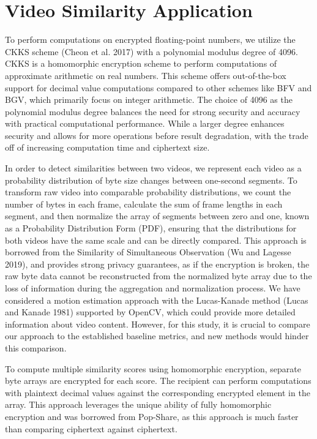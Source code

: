 \section{Video Similarity Application}
To perform computations on encrypted floating-point numbers, we utilize the CKKS scheme (Cheon et al. 2017) with a polynomial modulus degree of 4096. CKKS is a homomorphic encryption scheme to perform computations of approximate arithmetic on real numbers. This scheme offers out-of-the-box support for decimal value computations compared to other schemes like BFV and BGV, which primarily focus on integer arithmetic. The choice of 4096 as the polynomial modulus degree balances the need for strong security and accuracy with practical computational performance. While a larger degree enhances security and allows for more operations before result degradation, with the trade off of increasing computation time and ciphertext size.

In order to detect similarities between two videos, we represent each video as a probability distribution of byte size changes between one-second segments. To transform raw video into comparable probability distributions, we count the number of bytes in each frame, calculate the sum of frame lengths in each segment, and then normalize the array of segments between zero and one, known as a Probability Distribution Form (PDF), ensuring that the distributions for both videos have the same scale and can be directly compared. This approach is borrowed from the Similarity of Simultaneous Observation (Wu and Lagesse 2019), and provides strong privacy guarantees, as if the encryption is broken, the raw byte data cannot be reconstructed from the normalized byte array due to the loss of information during the aggregation and normalization process. We have considered a motion estimation approach with the Lucas-Kanade method (Lucas and Kanade 1981) supported by OpenCV, which could provide more detailed information about video content. However, for this study, it is crucial to compare our approach to the established baseline metrics, and new methods would hinder this comparison.

To compute multiple similarity scores using homomorphic encryption, separate byte arrays are encrypted for each score. The recipient can perform computations with plaintext decimal values against the corresponding encrypted element in the array. This approach leverages the unique ability of fully homomorphic encryption and was borrowed from Pop-Share, as this approach is much faster than comparing ciphertext against ciphertext. 

